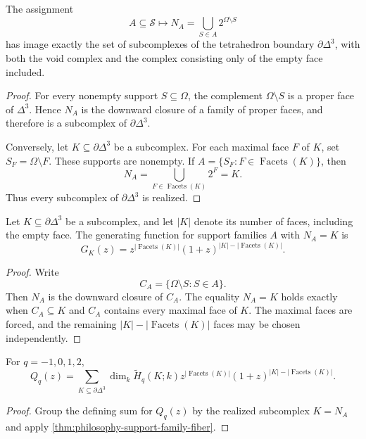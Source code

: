 \begin{theorem}
\label{thm:philosophy-support-to-nerve-realization}
The assignment
$$
  A\subseteq\mathcal{S}
  \longmapsto
  N_{A}
  =
  \bigcup_{S\in A}2^{\Omega\setminus S}
$$
has image exactly the set of subcomplexes of the tetrahedron boundary
$\partial\Delta^{3}$, with both the void complex and the complex
consisting only of the empty face included.
\end{theorem}
\begin{proof}
For every nonempty support $S\subseteq\Omega$, the complement
$\Omega\setminus S$ is a proper face of $\Delta^{3}$. Hence $N_{A}$ is
the downward closure of a family of proper faces, and therefore is a
subcomplex of $\partial\Delta^{3}$.

Conversely, let $K\subseteq\partial\Delta^{3}$ be a subcomplex. For
each maximal face $F$ of $K$, set $S_{F}=\Omega\setminus F$. These
supports are nonempty. If $A=\{S_{F}:F\in\operatorname{Facets}(K)\}$,
then
$$
  N_{A}
  =
  \bigcup_{F\in\operatorname{Facets}(K)}2^{F}
  =
  K.
$$
Thus every subcomplex of $\partial\Delta^{3}$ is realized.
\end{proof}


\begin{theorem}
\label{thm:philosophy-support-family-fiber}
Let $K\subseteq\partial\Delta^{3}$ be a subcomplex, and let $|K|$
denote its number of faces, including the empty face. The generating
function for support families $A$ with $N_{A}=K$ is
$$
  G_{K}(z)
  =
  z^{|\operatorname{Facets}(K)|}
  (1+z)^{|K|-|\operatorname{Facets}(K)|}.
$$
\end{theorem}
\begin{proof}
Write
$$
  C_{A}=\{\Omega\setminus S:S\in A\}.
$$
Then $N_{A}$ is the downward closure of $C_{A}$. The equality $N_{A}=K$
holds exactly when $C_{A}\subseteq K$ and $C_{A}$ contains every maximal
face of $K$. The maximal faces are forced, and the remaining
$|K|-|\operatorname{Facets}(K)|$ faces may be chosen independently.
\end{proof}

\begin{corollary}
\label{cor:philosophy-subcomplex-weighted-support-polynomials}
For $q=-1,0,1,2$,
$$
  Q_{q}(z)
  =
  \sum_{K\subseteq\partial\Delta^{3}}
  \dim_{k}\widetilde{H}_{q}(K;k)
  z^{|\operatorname{Facets}(K)|}
  (1+z)^{|K|-|\operatorname{Facets}(K)|}.
$$
\end{corollary}
\begin{proof}
Group the defining sum for $Q_{q}(z)$ by the realized subcomplex
$K=N_{A}$ and apply \autoref{thm:philosophy-support-family-fiber}.
\end{proof}

